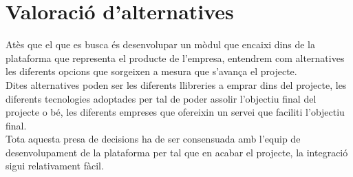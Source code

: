 \section{Valoració d'alternatives}
Atès que el que es busca és desenvolupar un mòdul que encaixi dins de la plataforma que representa el producte de l'empresa, entendrem com alternatives les diferents opcions que sorgeixen a mesura que s'avança el projecte.\\
\newline Dites alternatives poden ser les diferents llibreries a emprar dins del projecte, les diferents tecnologies adoptades per tal de poder assolir l'objectiu final del projecte o bé, les diferents empreses que ofereixin un servei que faciliti l'objectiu final.\\
\newline Tota aquesta presa de decisions ha de ser consensuada amb l'equip de desenvolupament de la plataforma per tal que en acabar el projecte, la integració sigui relativament fàcil.
